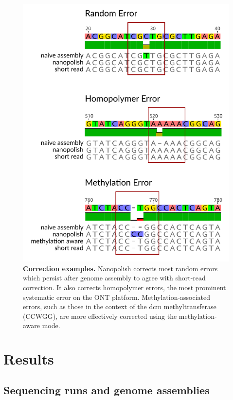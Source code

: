 \begin{figure}[!ht]
\centering
\includegraphics[width = .75\linewidth,keepaspectratio]{figure/npfixes.pdf}
\caption[Correction examples]{{\bf Correction examples.} Nanopolish corrects most random errors which persist after genome assembly to agree with short-read correction. It also corrects homopolymer errors, the most prominent systematic error on the ONT platform. Methylation-associated errors, such as those in the context of the dcm methyltransferase (CCWGG), are more effectively corrected using the methylation-aware mode. }
\label{fig:npfixes}
\end{figure}



\section{Results}
\label{sec:results}

\subsection{Sequencing runs and genome assemblies}
\label{sec:runs}

